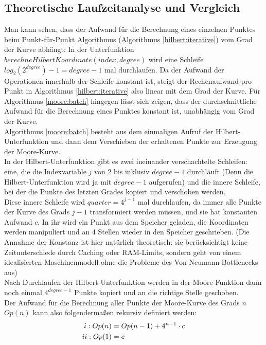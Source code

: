 \documentclass[course=erap]{aspdoc}
\newcommand{\uproman}[1]{\uppercase\expandafter{\romannumeral#1}}
\begin{document}
\subsection{Theoretische Laufzeitanalyse und Vergleich}
Man kann sehen, dass der Aufwand für die Berechnung eines einzelnen Punktes beim Punkt-für-Punkt Algorithmus (Algorithmus \ref{hilbert:iterative}) vom Grad der Kurve abhängt: In der Unterfunktion $berechneHilbertKoordinate(index, degree)$  wird eine Schleife $log_2(2^{degree})-1 = degree -1$ mal durchlaufen. Da der Aufwand der Operationen innerhalb der Schleife konstant ist, steigt der Rechenaufwand pro Punkt in Algorithmus \ref{hilbert:iterative} also linear mit dem Grad der Kurve.
\newline
Für Algorithmus \ref{moore:batch} hingegen lässt sich zeigen, dass der durchschnittliche Aufwand für die Berechnung eines Punktes konstant ist, unabhängig vom Grad der Kurve. \\
Algorithmus \ref{moore:batch} besteht aus dem einmaligen Aufruf der Hilbert-Unterfunktion und dann dem Verschieben der erhaltenen Punkte zur Erzeugung der Moore-Kurve. \\
In der Hilbert-Unterfunktion gibt es zwei ineinander verschachtelte Schleifen: eine, die die Indexvariable $j$ von $2$ bis inklusiv  $degree -1$ durchläuft (Denn die Hilbert-Unterfunktion wird ja mit $degree-1$ aufgerufen) und die innere Schleife, bei der die Punkte des letzten Grades kopiert und verschoben werden. \\ 
Diese innere Schleife wird $quarter = 4^{j-1}$ mal durchlaufen, da immer alle Punkte der Kurve des Grads $j-1$ transformiert werden müssen, und sie hat konstanten Aufwand $c$. In ihr wird ein Punkt aus dem Speicher  geladen, die Koordinaten werden manipuliert und an 4 Stellen wieder in den Speicher geschrieben. (Die Annahme der Konstanz ist hier natürlich theoretisch: sie berücksichtigt keine Zeitunterschiede durch Caching oder RAM-Limits, sondern geht von einem idealisierten Maschinenmodell ohne die Probleme des Von-Neumann-Bottlenecks aus)\\
Nach Durchlaufen der Hilbert-Unterfunktion werden in der Moore-Funktion dann noch einmal  $4^{degree-1}$ Punkte kopiert und an die richtige Stelle geschoben. \\ Der Aufwand für die Berechnung aller Punkte der Moore-Kurve des Grads $n$ $Op(n)$ kann also folgendermaßen rekursiv definiert werden:
\begin{align*}
\uproman{1}: Op(n) &= Op(n-1) + 4^{n-1}\cdot c \\
\uproman{2}: Op(1) &= c
\end{align*}
\end{document}
